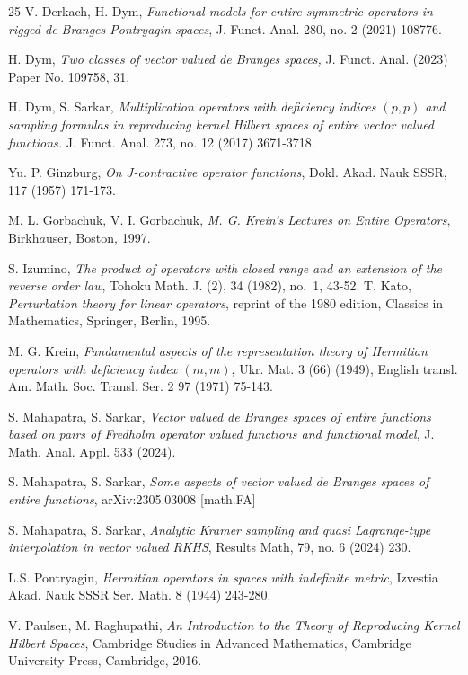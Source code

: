 \documentclass [12pt,reqno]{amsart}
\numberwithin{equation}{subsection}
\numberwithin{equation}{section}
\begin{document}
\begin{thebibliography}{25}
V. Derkach, H. Dym,\emph{ Functional models for entire symmetric operators in rigged de Branges Pontryagin spaces}, J. Funct. Anal. 280, no. 2 (2021) 108776.

 H. Dym, \emph{Two classes of vector valued de {B}ranges spaces,} J. Funct. Anal. (2023) Paper No. 109758, 31.

H. Dym, S. Sarkar, \emph{Multiplication operators with deficiency indices $(p, p)$ and sampling formulas in reproducing kernel Hilbert spaces of entire vector valued functions.} J. Funct. Anal. 273, no. 12 (2017) 3671-3718.

Yu. P. Ginzburg, \emph{On $J$-contractive operator functions}, Dokl. Akad. Nauk SSSR, 117 (1957) 171-173.

M. L. Gorbachuk, V. I. Gorbachuk, \emph{M. G. Krein’s Lectures on Entire Operators}, Birkh$\ddot{a}$user, Boston, 1997.

S. Izumino, \emph{The product of operators with closed range and an extension of the reverse order law}, Tohoku Math. J. (2), 34 (1982), no.~1, 43-52.
T. Kato, \emph{Perturbation theory for linear operators}, reprint of the 1980 edition, 
Classics in Mathematics, Springer, Berlin, 1995.

M. G. Krein, \emph{Fundamental aspects of the representation theory of Hermitian operators with deficiency index $(m, m)$}, Ukr.
Mat. 3 (66) (1949), English transl. Am. Math. Soc. Transl. Ser. 2 97 (1971) 75-143.
	
 S. Mahapatra, S. Sarkar, \emph{Vector valued de Branges spaces of entire functions based on pairs of Fredholm operator valued functions and functional model}, J. Math. Anal. Appl. 533 (2024).
	 
 S. Mahapatra, S. Sarkar, \emph{Some aspects of vector valued de Branges spaces of entire functions}, arXiv:2305.03008 [math.FA]	 
	
 S. Mahapatra, S. Sarkar, \emph{Analytic Kramer sampling and quasi Lagrange-type interpolation in vector valued RKHS}, Results Math, 79, no. 6 (2024) 230.

L.S. Pontryagin, \emph{Hermitian operators in spaces with indefinite metric}, Izvestia Akad. Nauk SSSR Ser. Math. 8 (1944) 243-280.

 V. Paulsen, M. Raghupathi,  \emph{An Introduction to the Theory of Reproducing Kernel Hilbert Spaces}, Cambridge Studies in Advanced Mathematics, Cambridge University Press, Cambridge, 2016.


\end{thebibliography}
\end{document}
